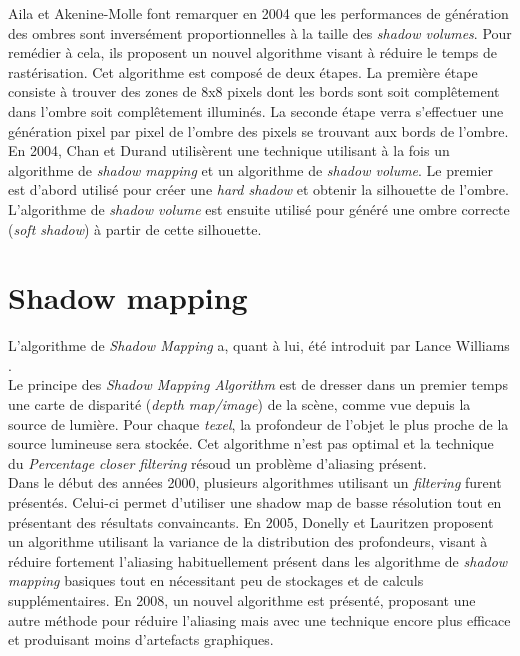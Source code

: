 \documentclass[a4paper,12pt]{report}
\begin{document}
Aila et Akenine-Molle font remarquer en 2004 \cite{aila2004hierarchical} que les performances de génération des ombres sont inversément proportionnelles à la taille des \textit{shadow volumes}. Pour remédier à cela, ils proposent un nouvel algorithme visant à réduire le temps de rastérisation. Cet algorithme est composé de deux étapes. La première étape consiste à trouver des zones de 8x8 pixels dont les bords sont soit compl\^etement dans l'ombre soit compl\^etement illuminés. La seconde étape verra s'effectuer une génération pixel par pixel de l'ombre des pixels se trouvant aux bords de l'ombre.
\\

En 2004, Chan et Durand\cite{chan2004efficient} utilisèrent une technique utilisant à la fois un algorithme de \textit{shadow mapping} et un algorithme de \textit{shadow volume}. Le premier est d'abord utilisé pour créer une \textit{hard shadow} et obtenir la silhouette de l'ombre. L'algorithme de \textit{shadow volume} est ensuite utilisé pour généré une ombre correcte (\textit{soft shadow}) à partir de cette silhouette.


\section{Shadow mapping}

L'algorithme de \textit{Shadow Mapping} a, quant à lui, été introduit par Lance Williams \cite{williams1978casting}.
\\

Le principe des \textit{Shadow Mapping Algorithm} est de dresser dans un premier temps une carte de disparité (\textit{depth map/image}) de la scène, comme vue depuis la source de lumière. Pour chaque \textit{texel}, la profondeur de l'objet le plus proche de la source lumineuse sera stockée. Cet algorithme n'est pas optimal et la technique du \textit{Percentage closer filtering}\cite{reeves1987rendering,fernando2005percentage} résoud un problème d'aliasing présent.
\\

Dans le début des années 2000, plusieurs algorithmes utilisant un \textit{filtering} furent présentés. Celui-ci permet d'utiliser une shadow map de basse résolution tout en présentant des résultats convaincants. En 2005, Donelly et Lauritzen \cite{donnelly2006variance} proposent un algorithme utilisant la variance de la distribution des profondeurs, visant à réduire fortement l'aliasing habituellement présent dans les algorithme de \textit{shadow mapping} basiques tout en nécessitant peu de stockages et de calculs supplémentaires. En 2008, un nouvel algorithme est présenté\cite{annen2008exponential}, proposant une autre méthode pour réduire l'aliasing mais avec une technique encore plus efficace et produisant moins d'artefacts graphiques. 
\\
\end{document}
